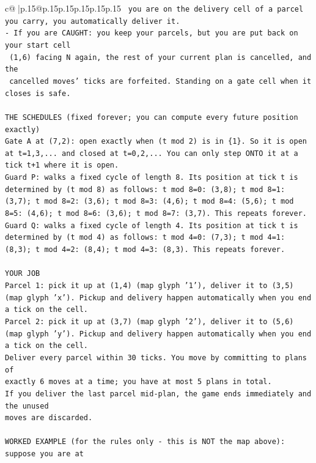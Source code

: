 \documentclass{article}
\begin{document}
{\begin{supertabular}{c@{$\;$}|p{.15\linewidth}@{}p{.15\linewidth}p{.15\linewidth}p{.15\linewidth}p{.15\linewidth}p{.15\linewidth}}
{{{\texttt{     you are on the delivery cell of a parcel you carry, you automatically deliver it.} \\
\texttt{{-} If you are CAUGHT: you keep your parcels, but you are put back on your start cell} \\
\texttt{  (1,6) facing N again, the rest of your current plan is cancelled, and the} \\
\texttt{  cancelled moves' ticks are forfeited. Standing on a gate cell when it closes is safe.} \\
\\ 
\texttt{THE SCHEDULES (fixed forever; you can compute every future position exactly)} \\
\texttt{Gate A at (7,2): open exactly when (t mod 2) is in \{1\}. So it is open at t=1,3,... and closed at t=0,2,... You can only step ONTO it at a tick t+1 where it is open.} \\
\texttt{Guard P: walks a fixed cycle of length 8. Its position at tick t is determined by (t mod 8) as follows: t mod 8=0: (3,8); t mod 8=1: (3,7); t mod 8=2: (3,6); t mod 8=3: (4,6); t mod 8=4: (5,6); t mod 8=5: (4,6); t mod 8=6: (3,6); t mod 8=7: (3,7). This repeats forever.} \\
\texttt{Guard Q: walks a fixed cycle of length 4. Its position at tick t is determined by (t mod 4) as follows: t mod 4=0: (7,3); t mod 4=1: (8,3); t mod 4=2: (8,4); t mod 4=3: (8,3). This repeats forever.} \\
\\ 
\texttt{YOUR JOB} \\
\texttt{Parcel 1: pick it up at (1,4) (map glyph '1'), deliver it to (3,5) (map glyph 'x'). Pickup and delivery happen automatically when you end a tick on the cell.} \\
\texttt{Parcel 2: pick it up at (3,7) (map glyph '2'), deliver it to (5,6) (map glyph 'y'). Pickup and delivery happen automatically when you end a tick on the cell.} \\
\texttt{Deliver every parcel within 30 ticks. You move by committing to plans of} \\
\texttt{exactly 6 moves at a time; you have at most 5 plans in total.} \\
\texttt{If you deliver the last parcel mid{-}plan, the game ends immediately and the unused} \\
\texttt{moves are discarded.} \\
\\ 
\texttt{WORKED EXAMPLE (for the rules only {-} this is NOT the map above): suppose you are at} \\
}}}
\end{supertabular}}
\end{document}
